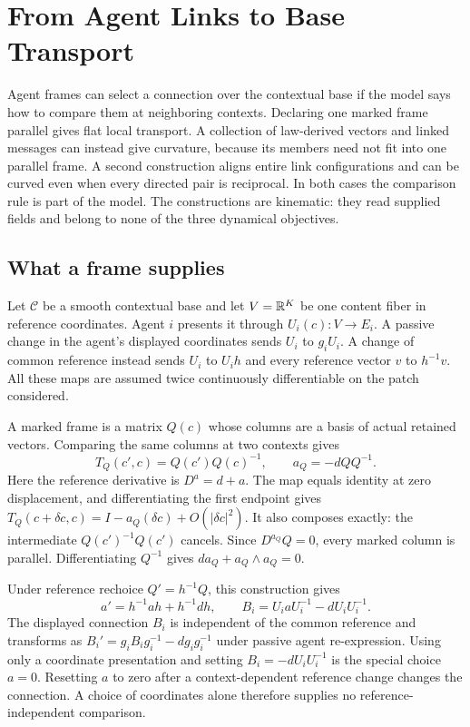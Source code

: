 \chapter{From Agent Links to Base Transport}
\label{comp:link-base-transport}

Agent frames can select a connection over the contextual base if the model says how to compare them at neighboring contexts. Declaring one marked frame parallel gives flat local transport. A collection of law-derived vectors and linked messages can instead give curvature, because its members need not fit into one parallel frame. A second construction aligns entire link configurations and can be curved even when every directed pair is reciprocal. In both cases the comparison rule is part of the model. The constructions are kinematic: they read supplied fields and belong to none of the three dynamical objectives.

\section{What a frame supplies}

Let $\mathcal C$ be a smooth contextual base and let $V=\mathbb R^K$ be one content fiber in reference coordinates. Agent $i$ presents it through $U_i(c):V\to E_i$. A passive change in the agent's displayed coordinates sends $U_i$ to $g_iU_i$. A change of common reference instead sends $U_i$ to $U_i h$ and every reference vector $v$ to $h^{-1}v$. All these maps are assumed twice continuously differentiable on the patch considered.

A marked frame is a matrix $Q(c)$ whose columns are a basis of actual retained vectors. Comparing the same columns at two contexts gives
\begin{equation}
T_Q(c',c)=Q(c')Q(c)^{-1},\qquad
a_Q=-dQ Q^{-1}.
\label{comp:ibt:frame}
\end{equation}
Here the reference derivative is $D^a=d+a$. The map equals identity at zero displacement, and differentiating the first endpoint gives $T_Q(c+\delta c,c)=I-a_Q(\delta c)+O(|\delta c|^2)$. It also composes exactly: the intermediate $Q(c')^{-1}Q(c')$ cancels. Since $D^{a_Q}Q=0$, every marked column is parallel. Differentiating $Q^{-1}$ gives $da_Q+a_Q\wedge a_Q=0$.

Under reference rechoice $Q'=h^{-1}Q$, this construction gives
\begin{equation}
a'=h^{-1}ah+h^{-1}dh,\qquad
B_i=U_i aU_i^{-1}-dU_iU_i^{-1}.
\label{comp:ibt:affine}
\end{equation}
The displayed connection $B_i$ is independent of the common reference and transforms as $B_i'=g_iB_ig_i^{-1}-dg_i g_i^{-1}$ under passive agent re-expression. Using only a coordinate presentation and setting $B_i=-dU_iU_i^{-1}$ is the special choice $a=0$. Resetting $a$ to zero after a context-dependent reference change changes the connection. A choice of coordinates alone therefore supplies no reference-independent comparison.

